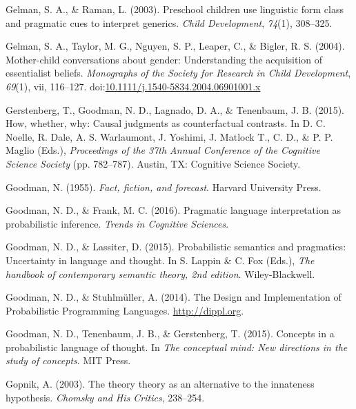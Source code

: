\documentclass[english,,man,floatsintext]{apa6}
\theoremstyle{definition}
\theoremstyle{definition}
\theoremstyle{definition}
\theoremstyle{remark}
\begin{document}
\leavevmode\hypertarget{ref-Gelman2003b}{}%
Gelman, S. A., \& Raman, L. (2003). Preschool children use linguistic
form class and pragmatic cues to interpret generics. \emph{Child
Development}, \emph{74}(1), 308--325.

\leavevmode\hypertarget{ref-GelmanEtAl2004}{}%
Gelman, S. A., Taylor, M. G., Nguyen, S. P., Leaper, C., \& Bigler, R.
S. (2004). Mother-child conversations about gender: Understanding the
acquisition of essentialist beliefs. \emph{Monographs of the Society for
Research in Child Development}, \emph{69}(1), vii, 116--127.
doi:\href{https://doi.org/10.1111/j.1540-5834.2004.06901001.x}{10.1111/j.1540-5834.2004.06901001.x}

\leavevmode\hypertarget{ref-Gerstenberg2015how}{}%
Gerstenberg, T., Goodman, N. D., Lagnado, D. A., \& Tenenbaum, J. B.
(2015). How, whether, why: Causal judgments as counterfactual contrasts.
In D. C. Noelle, R. Dale, A. S. Warlaumont, J. Yoshimi, J. Matlock T.,
C. D., \& P. P. Maglio (Eds.), \emph{Proceedings of the 37th Annual
Conference of the Cognitive Science Society} (pp. 782--787). Austin, TX:
Cognitive Science Society.

\leavevmode\hypertarget{ref-Goodman1955}{}%
Goodman, N. (1955). \emph{Fact, fiction, and forecast}. Harvard
University Press.

\leavevmode\hypertarget{ref-Goodman2016}{}%
Goodman, N. D., \& Frank, M. C. (2016). Pragmatic language
interpretation as probabilistic inference. \emph{Trends in Cognitive
Sciences}.

\leavevmode\hypertarget{ref-GoodmanLassiter}{}%
Goodman, N. D., \& Lassiter, D. (2015). Probabilistic semantics and
pragmatics: Uncertainty in language and thought. In S. Lappin \& C. Fox
(Eds.), \emph{The handbook of contemporary semantic theory, 2nd
edition}. Wiley-Blackwell.

\leavevmode\hypertarget{ref-dippl}{}%
Goodman, N. D., \& Stuhlmüller, A. (2014). The Design and Implementation
of Probabilistic Programming Languages. \url{http://dippl.org}.

\leavevmode\hypertarget{ref-Goodmanconcepts}{}%
Goodman, N. D., Tenenbaum, J. B., \& Gerstenberg, T. (2015). Concepts in
a probabilistic language of thought. In \emph{The conceptual mind: New
directions in the study of concepts}. MIT Press.

\leavevmode\hypertarget{ref-Gopnik2003theory}{}%
Gopnik, A. (2003). The theory theory as an alternative to the innateness
hypothesis. \emph{Chomsky and His Critics}, 238--254.
\end{document}
